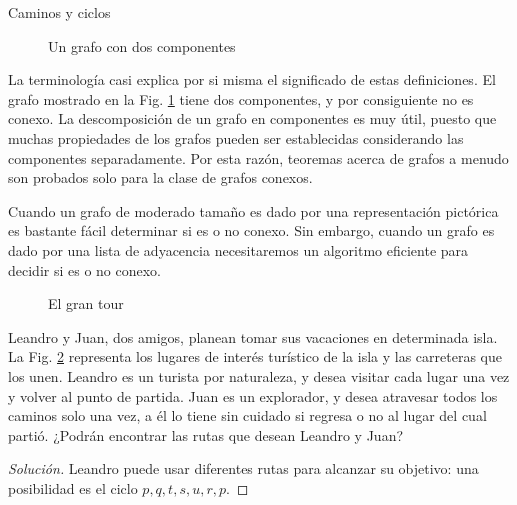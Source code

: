 \begin{section}{Caminos y ciclos}
\begin{figure}[t]
    \begin{center}
\end{center}
\caption{Un grafo con dos componentes} \label{f5.6}
\end{figure}

La terminología casi explica por si misma el significado de estas definiciones. El grafo mostrado en la Fig. \ref{f5.6} tiene dos componentes, y por consiguiente no es conexo. La descomposición de un grafo en componentes es muy útil, puesto que muchas propiedades de los grafos pueden ser establecidas considerando las componentes separadamente. Por esta razón, teoremas acerca de grafos a menudo son probados solo para la clase de grafos conexos.

Cuando un grafo de moderado tamaño es dado por una representación pictórica es bastante fácil determinar si es o no conexo. Sin embargo, cuando un grafo es dado por una lista de adyacencia necesitaremos un algoritmo eficiente para decidir si es o no conexo. 

\begin{figure}[b]
    \begin{center}
    \end{center}
    \caption{El gran tour} \label{f5.7}
\end{figure}

\begin{ejemplo}\label{chunner} Leandro y Juan, dos amigos, planean tomar sus vacaciones en determinada isla. La Fig. \ref{f5.7} representa los lugares de interés turístico de la isla y las carreteras que los unen. Leandro es un turista por naturaleza, y desea visitar cada lugar una vez y volver al punto de partida. Juan es un explorador, y desea atravesar todos los caminos solo una vez, a él lo tiene sin cuidado si regresa o no al lugar del cual partió. ¿Podrán encontrar las rutas que desean Leandro y Juan?
\begin{proof}[Solución] Leandro puede usar diferentes rutas para alcanzar su objetivo: una posibilidad es el ciclo $p,q,t,s,u,r,p$.
    

\end{proof}
\end{ejemplo}
\end{section}
